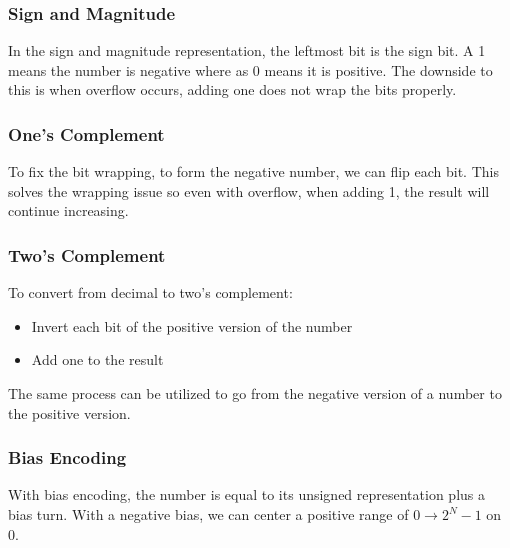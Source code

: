 \documentclass{article}
\begin{document}
\subsubsection{Sign and Magnitude}
In the sign and magnitude representation, the leftmost bit is the sign bit.
A 1 means the number is negative where as 0 means it is positive. The downside to this is when overflow occurs, adding one does not wrap the bits properly.
\subsubsection{One's Complement}
To fix the bit wrapping, to form the negative number, we can flip each bit. This solves the wrapping issue so even with overflow, when adding 1, the result will continue increasing.
\subsubsection{Two's Complement}
To convert from decimal to two's complement:
\begin{itemize}
    \item Invert each bit of the positive version of the number
    \item Add one to the result
\end{itemize}
The same process can be utilized to go from the negative version of a number to the positive version.
\subsubsection{Bias Encoding}
With bias encoding, the number is equal to its unsigned representation plus a bias turn. With a negative bias,
we can center a positive range of $0 \rightarrow 2^N - 1$ on 0.
\end{document}
